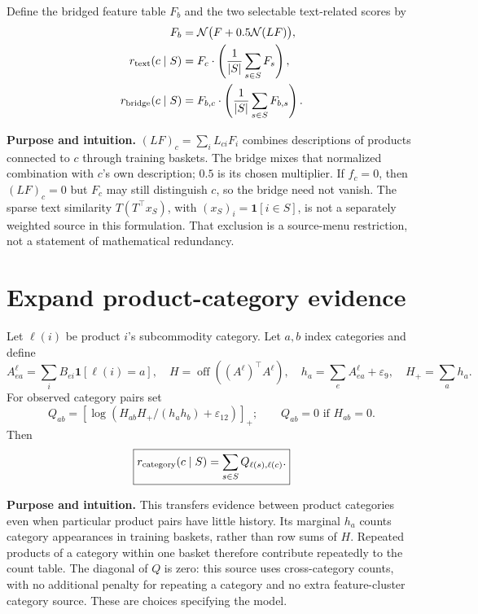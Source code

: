 \documentclass[11pt,a4paper]{article}
\newcommand{\off}{\operatorname{off}}\newcommand{\diag}{\operatorname{diag}}
\newcommand{\N}{\mathcal N}\newcommand{\sd}{\operatorname{sd}}
\newcommand{\why}{\par\textbf{Purpose and intuition.} }
\numberwithin{equation}{section}
\begin{document}
Define the bridged feature table $F_b$ and the two selectable text-related scores by
\begin{align}
F_b&=\N\bigl(F+0.5\N(LF)\bigr),\\
r_{\rm text}(c\mid S)&=F_c\cdot\left(\frac1{|S|}\sum_{s\in S}F_s\right),\\
r_{\rm bridge}(c\mid S)&=F_{b,c}\cdot\left(\frac1{|S|}\sum_{s\in S}F_{b,s}\right).
\end{align}
\why $(LF)_c=\sum_iL_{ci}F_i$ combines descriptions of products connected to $c$ through
training baskets. The bridge mixes that normalized combination with $c$'s own description;
$0.5$ is its chosen multiplier. If $f_c=0$, then $(LF)_c=0$ but $F_c$ may still distinguish
$c$, so the bridge need not vanish. The sparse text similarity $T(T^\top x_S)$, with
$(x_S)_i=\mathbf1[i\in S]$, is not a separately weighted source in this formulation.
That exclusion is a source-menu restriction, not a statement of mathematical redundancy.

\section{Expand product-category evidence}
Let $\ell(i)$ be product $i$'s subcommodity category. Let $a,b$ index categories and define
\begin{equation}
A^{\ell}_{ea}=\sum_iB_{ei}\mathbf1[\ell(i)=a],\quad
H=\off((A^{\ell})^\top A^{\ell}),\quad
h_a=\sum_e A^{\ell}_{ea}+\varepsilon_9,\quad H_+=\sum_a h_a.
\end{equation}
For observed category pairs set
\begin{equation}
Q_{ab}=[\log(H_{ab}H_+/(h_a h_b)+\varepsilon_{12})]_+;
\qquad Q_{ab}=0\text{ if }H_{ab}=0.
\end{equation}
Then
\begin{equation}
\boxed{r_{\rm category}(c\mid S)=\sum_{s\in S}Q_{\ell(s),\ell(c)}.}
\end{equation}
\why This transfers evidence between product categories even when particular product
pairs have little history. Its marginal $h_a$ counts category appearances in training
baskets, rather than row sums of $H$. Repeated products of a category within one basket
therefore contribute repeatedly to the count table. The diagonal of $Q$ is zero: this
source uses cross-category counts, with no additional penalty for repeating a category
and no extra feature-cluster category source. These are choices specifying the model.
\end{document}
